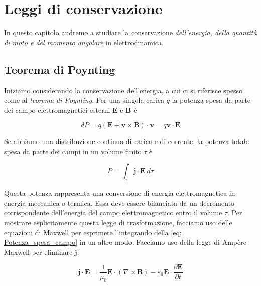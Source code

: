 \chapter{Leggi di conservazione}

In questo capitolo andremo a studiare la conservazione \emph{dell'energia, della quantità di moto e del momento angolare} in elettrodinamica.

\section{Teorema di Poynting}
 
Iniziamo considerando la conservazione dell'energia, a cui ci si riferisce spesso come al \emph{teorema di Poynting}. Per una singola carica $q$ la potenza spesa da parte dei campo elettromagnetici esterni $\mathbf{E}$ e $\mathbf{B}$ è 

\begin{equation*}
    dP = q(\mathbf{E} + \mathbf{v} \times \mathbf{B}) \cdot \mathbf{v} = q \mathbf{v} \cdot \mathbf{E} 
\end{equation*}

Se abbiamo una distribuzione continua di carica e di corrente, la potenza totale spesa da parte dei campi in un volume finito $\tau$ è 

\begin{tcolorbox}[colback=yellow!10!white, colframe=orange!70!black, boxrule=0.8pt]
\begin{equation} \label{eq: Potenza_spesa_campo}
    P = \int_{\tau} \mathbf{j} \cdot \mathbf{E} \ d\tau 
\end{equation}
\end{tcolorbox}

Questa potenza rappresenta una conversione di energia elettromagnetica in energia meccanica o termica.
Essa deve essere bilanciata da un decremento corrispondente dell'energia del campo elettromagnetico entro il volume $\tau$. 
Per mostrare esplicitamente questa legge di trasformazione, facciamo uso delle equazioni di Maxwell per esprimere l'integrando della \ref{eq: Potenza_spesa_campo} in un altro modo. Facciamo uso della legge di Ampère-Maxwell per eliminare $\mathbf{j}$:

\begin{equation}
    \mathbf{j} \cdot \mathbf{E} = \frac{1}{\mu_0} \mathbf{E} \cdot (\nabla \times \mathbf{B}) - \varepsilon_0 \mathbf{E} \cdot \frac{\partial \mathbf{E}}{\partial t} 
\end{equation}

